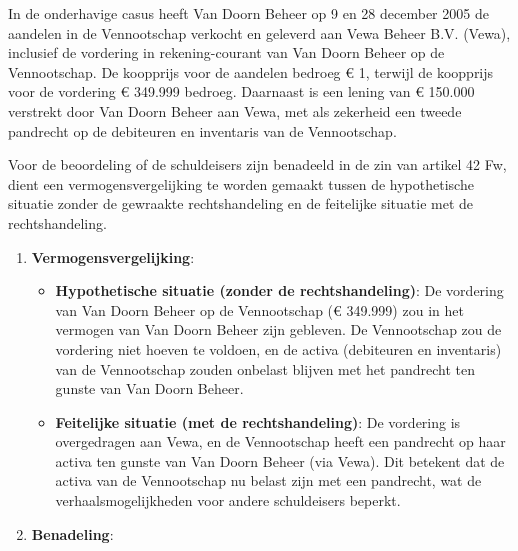 \documentclass[
  dutch,
  a4paper,
]{article}
\providecommand{\tightlist}{%
  \setlength{\itemsep}{0pt}\setlength{\parskip}{0pt}}
\begin{document}
In de onderhavige casus heeft Van Doorn Beheer op 9 en 28 december 2005 de aandelen in de Vennootschap verkocht en geleverd aan Vewa Beheer B.V. (Vewa), inclusief de vordering in rekening-courant van Van Doorn Beheer op de Vennootschap. De koopprijs voor de aandelen bedroeg € 1, terwijl de koopprijs voor de vordering € 349.999 bedroeg. Daarnaast is een lening van € 150.000 verstrekt door Van Doorn Beheer aan Vewa, met als zekerheid een tweede pandrecht op de debiteuren en inventaris van de Vennootschap.

Voor de beoordeling of de schuldeisers zijn benadeeld in de zin van artikel 42 Fw, dient een vermogensvergelijking te worden gemaakt tussen de hypothetische situatie zonder de gewraakte rechtshandeling en de feitelijke situatie met de rechtshandeling.

\begin{enumerate}
\def\labelenumi{\arabic{enumi}.}
\tightlist
\item
  \textbf{Vermogensvergelijking}:

  \begin{itemize}
  \tightlist
  \item
    \textbf{Hypothetische situatie (zonder de rechtshandeling)}: De vordering van Van Doorn Beheer op de Vennootschap (€ 349.999) zou in het vermogen van Van Doorn Beheer zijn gebleven. De Vennootschap zou de vordering niet hoeven te voldoen, en de activa (debiteuren en inventaris) van de Vennootschap zouden onbelast blijven met het pandrecht ten gunste van Van Doorn Beheer.
  \item
    \textbf{Feitelijke situatie (met de rechtshandeling)}: De vordering is overgedragen aan Vewa, en de Vennootschap heeft een pandrecht op haar activa ten gunste van Van Doorn Beheer (via Vewa). Dit betekent dat de activa van de Vennootschap nu belast zijn met een pandrecht, wat de verhaalsmogelijkheden voor andere schuldeisers beperkt.
  \end{itemize}
\item
  \textbf{Benadeling}:


\end{enumerate}
\end{document}
